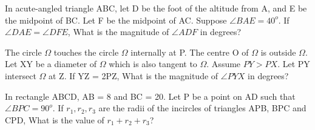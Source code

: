\item In acute-angled triangle ABC, let D be the foot of the altitude from A, and E be the midpoint of BC. Let F be the midpoint of AC. Suppose $\angle BAE = 40^{o}$. If $\angle DAE = \angle DFE$, What is the magnitude of $\angle ADF$ in degrees?

\item The circle $\Omega$ touches the circle $\Omega$ internally at P. The centre O of $\Omega$ is outside $\Omega$. Let XY be a diameter of $\Omega$ which is also tangent to $\Omega$. Assume $PY > PX$. Let PY intersect $\Omega$ at Z. If YZ = 2PZ, What is the magnitude of $\angle PYX$ in degrees?

\item In rectangle ABCD, AB = 8 and BC = 20. Let P be a point on AD such that  $\angle BPC = 90^{o}$. If $r_1, r_2, r_3$ are the radii of the incircles of triangles APB, BPC and CPD, What is the value of $r_1 + r_2 + r_3$?
